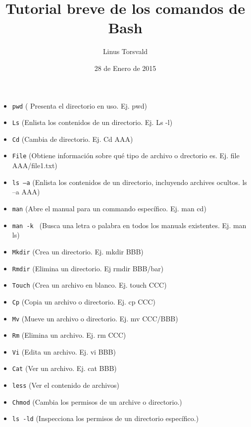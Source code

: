 \documentclass[12pt]{article}
\title{Tutorial breve de los comandos de Bash}
\author{Linus Torsvald}
\date{28 de Enero de 2015}
\begin{document}
\maketitle
\begin{itemize}
\item {\tt pwd} ( Presenta el directorio en uso. Ej. pwd) 
\item {\tt Ls} (Enlista los contenidos de un directorio. Ej. Ls -l)
\item {\tt Cd} (Cambia de directorio. Ej. Cd AAA)
\item {\tt File} (Obtiene información sobre qué tipo de archivo o drectorio es. Ej. file AAA/file1.txt) 
\item {\tt ls –a} (Enlista los contenidos de un directorio, incluyendo archives ocultos. ls –a AAA)
\item {\tt man} (Abre el manual para un commando específico. Ej.  man cd) 
\item {\tt man -k } (Busca una letra o palabra en todos los manuals existentes. Ej. man ls)
\item {\tt Mkdir} (Crea un directorio. Ej. mkdir BBB)
\item {\tt Rmdir} (Elimina un directorio. Ej rmdir BBB/bar) 
\item {\tt Touch} (Crea un archivo en blanco. Ej. touch CCC)
\item {\tt Cp} (Copia un archivo o directorio. Ej. cp CCC)
\item {\tt Mv} (Mueve un archivo o directorio. Ej. mv CCC/BBB) 
\item {\tt Rm} (Elimina un archivo. Ej. rm CCC)
\item {\tt Vi} (Edita un archivo. Ej. vi BBB)
\item {\tt Cat} (Ver un archivo. Ej. cat BBB) 
\item {\tt less} (Ver el contenido de archivos)
\item {\tt Chmod} (Cambia los permisos de un archive o directorio.)
\item {\tt ls -ld} (Inspecciona los permisos de un directorio específico.)
\end{itemize}
\end{document}
